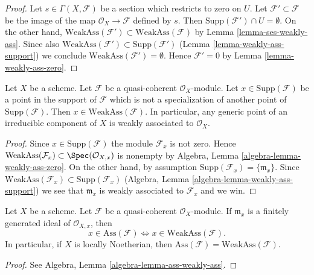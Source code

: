 \begin{proof}
Let $s \in \Gamma(X, \mathcal{F})$ be a section which restricts to zero on $U$.
Let $\mathcal{F}' \subset \mathcal{F}$ be the image of the map
$\mathcal{O}_X \to \mathcal{F}$ defined by $s$. Then
$\text{Supp}(\mathcal{F}') \cap U = \emptyset$. On the other hand,
$\text{WeakAss}(\mathcal{F}') \subset \text{WeakAss}(\mathcal{F})$
by Lemma \ref{lemma-ses-weakly-ass}. Since also
$\text{WeakAss}(\mathcal{F}') \subset \text{Supp}(\mathcal{F}')$
(Lemma \ref{lemma-weakly-ass-support}) we conclude
$\text{WeakAss}(\mathcal{F}') = \emptyset$.
Hence $\mathcal{F}' = 0$ by Lemma \ref{lemma-weakly-ass-zero}.
\end{proof}

\begin{lemma}
\label{lemma-minimal-support-in-weakly-ass}
Let $X$ be a scheme.
Let $\mathcal{F}$ be a quasi-coherent $\mathcal{O}_X$-module.
Let $x \in \text{Supp}(\mathcal{F})$ be a point in the support
of $\mathcal{F}$ which is not a specialization of another point of
$\text{Supp}(\mathcal{F})$. Then
$x \in \text{WeakAss}(\mathcal{F})$.
In particular, any generic point of an irreducible component of $X$
is weakly associated to $\mathcal{O}_X$.
\end{lemma}

\begin{proof}
Since $x \in \text{Supp}(\mathcal{F})$ the module $\mathcal{F}_x$
is not zero. Hence
$\text{WeakAss}(\mathcal{F}_x) \subset \Spec(\mathcal{O}_{X, x})$
is nonempty by
Algebra, Lemma \ref{algebra-lemma-weakly-ass-zero}.
On the other hand, by assumption
$\text{Supp}(\mathcal{F}_x) = \{\mathfrak m_x\}$.
Since
$\text{WeakAss}(\mathcal{F}_x) \subset \text{Supp}(\mathcal{F}_x)$
(Algebra, Lemma \ref{algebra-lemma-weakly-ass-support})
we see that $\mathfrak m_x$ is weakly associated to $\mathcal{F}_x$
and we win.
\end{proof}

\begin{lemma}
\label{lemma-ass-weakly-ass}
Let $X$ be a scheme.
Let $\mathcal{F}$ be a quasi-coherent $\mathcal{O}_X$-module.
If $\mathfrak m_x$ is a finitely generated ideal of $\mathcal{O}_{X, x}$,
then
$$
x \in \text{Ass}(\mathcal{F}) \Leftrightarrow
x \in \text{WeakAss}(\mathcal{F}).
$$
In particular, if $X$ is locally Noetherian, then
$\text{Ass}(\mathcal{F}) = \text{WeakAss}(\mathcal{F})$.
\end{lemma}

\begin{proof}
See
Algebra, Lemma \ref{algebra-lemma-ass-weakly-ass}.
\end{proof}

